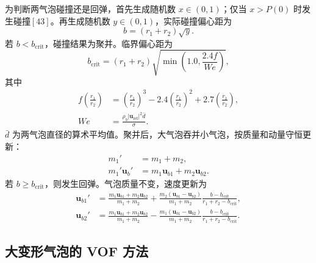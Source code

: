 \documentclass[UTF8,zihao=-4,fontset=fandol]{ctexart}
\newcommand{\vect}[1]{\bm{#1}}
\begin{document}
为判断两气泡碰撞还是回弹，首先生成随机数 $x\in(0,1)$；仅当 $x>P(0)$ 时发生碰撞\([43]\)。再生成随机数 $y\in(0,1)$，实际碰撞偏心距为
\begin{equation}
b=(r_1+r_2)\sqrt{y}. \tag{15}
\end{equation}
若 $b<b_{\mathrm{crit}}$，碰撞结果为聚并。临界偏心距为
\begin{equation}
b_{\mathrm{crit}}=(r_1+r_2)
\sqrt{\min\!\left(1.0,\frac{2.4f}{We}\right)}, \tag{16}
\end{equation}
其中
\begin{align}
f\!\left(\frac{r_1}{r_2}\right)&=
\left(\frac{r_1}{r_2}\right)^3-2.4\left(\frac{r_1}{r_2}\right)^2
+2.7\left(\frac{r_1}{r_2}\right), \tag{17}\\
We&=\frac{\rho_b|\vect u_{\mathrm{rel}}|^2\bar d}{\sigma}. \tag{18}
\end{align}
$\bar d$ 为两气泡直径的算术平均值。聚并后，大气泡吞并小气泡，按质量和动量守恒更新：
\begin{align}
m_1'&=m_1+m_2, \tag{19}\\
m_1'\vect u_b'&=m_1\vect u_{b1}+m_2\vect u_{b2}. \tag{20}
\end{align}
若 $b\ge b_{\mathrm{crit}}$，则发生回弹。气泡质量不变，速度更新为
\begin{align}
\vect u_{b1}'&=\frac{m_1\vect u_{b1}+m_2\vect u_{b2}}{m_1+m_2}
+\frac{m_2(\vect u_{b1}-\vect u_{b2})}{m_1+m_2}
\frac{b-b_{\mathrm{crit}}}{r_1+r_2-b_{\mathrm{crit}}}, \tag{21}\\
\vect u_{b2}'&=\frac{m_1\vect u_{b1}+m_2\vect u_{b2}}{m_1+m_2}
-\frac{m_1(\vect u_{b1}-\vect u_{b2})}{m_1+m_2}
\frac{b-b_{\mathrm{crit}}}{r_1+r_2-b_{\mathrm{crit}}}. \tag{22}
\end{align}

\subsection{大变形气泡的 VOF 方法}
\end{document}
